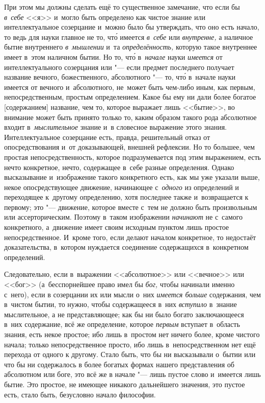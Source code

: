При этом мы должны сделать ещё то существенное замечание, что если бы
{\em в~себе} <<я>> и~могло быть определено как чистое знание или
интеллектуальное созерцание и~можно было бы утверждать, что оно есть начало, то
ведь для науки главное не то, чт\'{о} имеется {\em в~себе} или {\em внутренне,}
а наличное бытие внутреннего {\em в~мышлении} и~та {\em определённость,}
которую такое внутреннее имеет в~этом наличном бытии. Но то, чт\'{о}
в~{\em начале} науки {\em имеется} от интеллектуального созерцания или "---
если предмет последнего получает название вечного, божественного, абсолютного
"--- то, чт\'{о} в~начале науки имеется от вечного и~абсолютного, не~может быть
чем-либо иным, как первым, непосредственным, простым определением. Какое бы
ему ни дали более богатое [содержанием] название, чем то, которое выражает
лишь <<бытие>>, во внимание может быть принято только то, каким образом
такого рода абсолютное входит в~{\em мыслительное} знание и~в словесное
выражение этого знания. Интеллектуальное созерцание есть, правда,
решительный отказ от опосредствования и~от доказывающей, внешней рефлексии. Но то
большее, чем простая непосредственность, которое подразумевается под этим
выражением, есть нечто конкретное, нечто, содержащее в~себе разные определения.
Однако высказывание и~изображение такого конкретного есть, как мы уже указали
выше, некое опосредствующее движение, начинающее с~{\em одного} из определений
и переходящее к~другому определению, хотя последнее также и~возвращается к
первому; это "--- движение, которое вместе с~тем не должно быть произвольным
или ассерторическим. Поэтому в~таком изображении {\em начинают} не с~самого
конкретного, а~движение имеет своим исходным пунктом лишь простое
непосредственное. И~кроме того, если делают началом конкретное, то недостаёт
доказательства, в~котором нуждается соединение содержащихся в~конкретном
определений.

Следовательно, если в~выражении <<абсолютное>> или <<вечное>> или <<бог>>
(а~бесспорнейшее право имел бы {\em бог,} чтобы начинали именно с~него), если
в созерцании их или мысли о~них {\em имеется больше} содержания, чем в~чистом
бытии, то нужно, чтобы содержащееся в~них {\em вступило} в~знание мыслительное,
а не представляющее; как бы ни было богато заключающееся в~них содержание, всё
же определение, которое {\em первым} вступает в~область знания, есть некое
простое; ибо лишь в~простом нет ничего более, кроме чистого начала; только
непосредственное просто, ибо лишь в~непосредственном нет ещё перехода от одного
к другому. Стало быть, что бы ни высказывали о~бытии или что бы ни содержалось
в более богатых формах нашего представления об абсолютном или боге, это всё же
в начале "--- лишь пустое слово и~имеется лишь бытие. Это простое, не имеющее
никакого дальнейшего значения, это пустое есть, стало быть, безусловно начало
философии.

